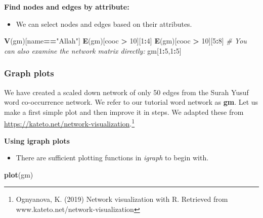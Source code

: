 \documentclass[
]{article}
\newenvironment{Shaded}{\begin{snugshade}}{\end{snugshade}}
\newcommand{\CommentTok}[1]{\textcolor[rgb]{0.56,0.35,0.01}{\textit{#1}}}
\newcommand{\DecValTok}[1]{\textcolor[rgb]{0.00,0.00,0.81}{#1}}
\newcommand{\FunctionTok}[1]{\textcolor[rgb]{0.13,0.29,0.53}{\textbf{#1}}}
\newcommand{\NormalTok}[1]{#1}
\newcommand{\SpecialCharTok}[1]{\textcolor[rgb]{0.81,0.36,0.00}{\textbf{#1}}}
\newcommand{\StringTok}[1]{\textcolor[rgb]{0.31,0.60,0.02}{#1}}
\providecommand{\tightlist}{%
  \setlength{\itemsep}{0pt}\setlength{\parskip}{0pt}}
\begin{document}
\normalsize

\textbf{Find nodes and edges by attribute:}

\begin{itemize}
\tightlist
\item
  We can select nodes and edges based on their attributes.
\end{itemize}

\footnotesize

\begin{Shaded}
\begin{Highlighting}[]
\FunctionTok{V}\NormalTok{(gm)[name}\SpecialCharTok{==}\StringTok{"Allah"}\NormalTok{]}
\FunctionTok{E}\NormalTok{(gm)[cooc }\SpecialCharTok{\textgreater{}} \DecValTok{10}\NormalTok{][}\DecValTok{1}\SpecialCharTok{:}\DecValTok{4}\NormalTok{]}
\FunctionTok{E}\NormalTok{(gm)[cooc }\SpecialCharTok{\textgreater{}} \DecValTok{10}\NormalTok{][}\DecValTok{5}\SpecialCharTok{:}\DecValTok{8}\NormalTok{]}
\CommentTok{\# You can also examine the network matrix directly:}
\NormalTok{gm[}\DecValTok{1}\SpecialCharTok{:}\DecValTok{5}\NormalTok{,}\DecValTok{1}\SpecialCharTok{:}\DecValTok{5}\NormalTok{]}
\end{Highlighting}
\end{Shaded}

\normalsize

\hypertarget{graph-plots}{%
\subsubsection{Graph plots}\label{graph-plots}}

We have created a scaled down network of only 50 edges from the Surah Yusuf word co-occurrence network. We refer to our tutorial word network as \textbf{gm}. Let us make a first simple plot and then improve it in steps. We adapted these from \url{https://kateto.net/network-visualization}.\footnote{Ognyanova, K. (2019) Network visualization with R. Retrieved from www.kateto.net/network-visualization}

\textbf{Using igraph plots}

\begin{itemize}
\tightlist
\item
  There are sufficient plotting functions in \emph{igraph} to begin with.
\end{itemize}

\begin{Shaded}
\begin{Highlighting}[]
\FunctionTok{plot}\NormalTok{(gm)}
\end{Highlighting}
\end{Shaded}
\end{document}
